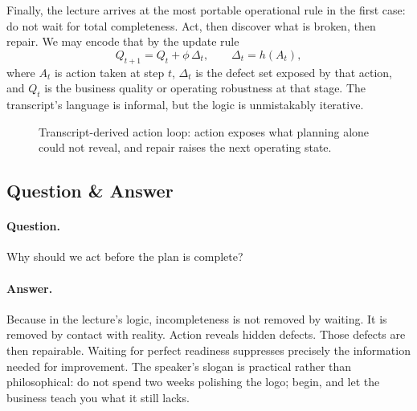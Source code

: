 Finally, the lecture arrives at the most portable operational rule in the first case: do not wait for total completeness. Act, then discover what is broken, then repair. We may encode that by the update rule
\begin{equation}
Q_{t+1} = Q_t + \phi\,\Delta_t,
\qquad
\Delta_t = h(A_t),
\end{equation}
where \(A_t\) is action taken at step \(t\), \(\Delta_t\) is the defect set exposed by that action, and \(Q_t\) is the business quality or operating robustness at that stage. The transcript's language is informal, but the logic is unmistakably iterative.

\begin{figure}[h]
\centering
{}
\caption{Transcript-derived action loop: action exposes what planning alone could not reveal, and repair raises the next operating state.}
\end{figure}

\subsection{Question \& Answer}

\paragraph{Question.} Why should we act before the plan is complete?

\paragraph{Answer.} Because in the lecture's logic, incompleteness is not removed by waiting. It is removed by contact with reality. Action reveals hidden defects. Those defects are then repairable. Waiting for perfect readiness suppresses precisely the information needed for improvement. The speaker's slogan is practical rather than philosophical: do not spend two weeks polishing the logo; begin, and let the business teach you what it still lacks.

